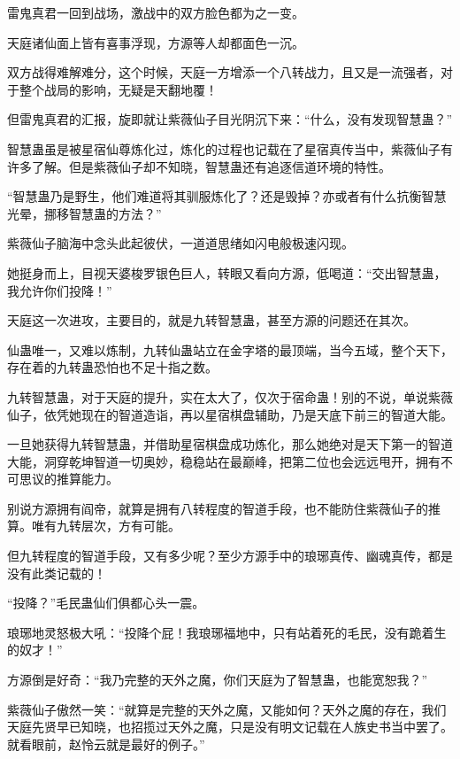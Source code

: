 
\begin{this_body}



雷鬼真君一回到战场，激战中的双方脸色都为之一变。

天庭诸仙面上皆有喜事浮现，方源等人却都面色一沉。

双方战得难解难分，这个时候，天庭一方增添一个八转战力，且又是一流强者，对于整个战局的影响，无疑是天翻地覆！

但雷鬼真君的汇报，旋即就让紫薇仙子目光阴沉下来：“什么，没有发现智慧蛊？”

智慧蛊虽是被星宿仙尊炼化过，炼化的过程也记载在了星宿真传当中，紫薇仙子有许多了解。但是紫薇仙子却不知晓，智慧蛊还有追逐信道环境的特性。

“智慧蛊乃是野生，他们难道将其驯服炼化了？还是毁掉？亦或者有什么抗衡智慧光晕，挪移智慧蛊的方法？”

紫薇仙子脑海中念头此起彼伏，一道道思绪如闪电般极速闪现。

她挺身而上，目视天婆梭罗银色巨人，转眼又看向方源，低喝道：“交出智慧蛊，我允许你们投降！”

天庭这一次进攻，主要目的，就是九转智慧蛊，甚至方源的问题还在其次。

仙蛊唯一，又难以炼制，九转仙蛊站立在金字塔的最顶端，当今五域，整个天下，存在着的九转蛊恐怕也不足十指之数。

九转智慧蛊，对于天庭的提升，实在太大了，仅次于宿命蛊！别的不说，单说紫薇仙子，依凭她现在的智道造诣，再以星宿棋盘辅助，乃是天底下前三的智道大能。

一旦她获得九转智慧蛊，并借助星宿棋盘成功炼化，那么她绝对是天下第一的智道大能，洞穿乾坤智道一切奥妙，稳稳站在最巅峰，把第二位也会远远甩开，拥有不可思议的推算能力。

别说方源拥有阎帝，就算是拥有八转程度的智道手段，也不能防住紫薇仙子的推算。唯有九转层次，方有可能。

但九转程度的智道手段，又有多少呢？至少方源手中的琅琊真传、幽魂真传，都是没有此类记载的！

“投降？”毛民蛊仙们俱都心头一震。

琅琊地灵怒极大吼：“投降个屁！我琅琊福地中，只有站着死的毛民，没有跪着生的奴才！”

方源倒是好奇：“我乃完整的天外之魔，你们天庭为了智慧蛊，也能宽恕我？”

紫薇仙子傲然一笑：“就算是完整的天外之魔，又能如何？天外之魔的存在，我们天庭先贤早已知晓，也招揽过天外之魔，只是没有明文记载在人族史书当中罢了。就看眼前，赵怜云就是最好的例子。”


\end{this_body}
